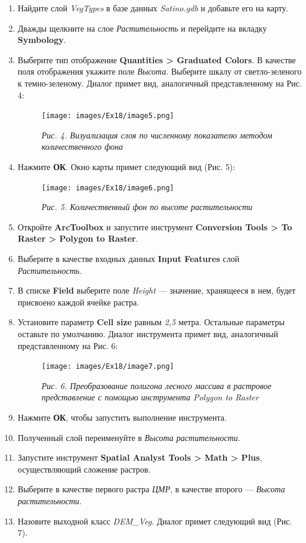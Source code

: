 \documentclass[12pt,]{book}
\begin{document}
\begin{enumerate}
\def\labelenumi{\arabic{enumi}.}
\item
  Найдите слой \emph{VegTypes} в базе данных \emph{Satino.gdb} и добавьте его на карту.
\item
  Дважды щелкните на слое \emph{Растительность} и перейдите на вкладку \textbf{Symbology}.
\item
  Выберите тип отображение \textbf{Quantities \textgreater{} Graduated Colors}. В качестве поля отображения укажите поле \emph{Высота}. Выберите шкалу от светло-зеленого к темно-зеленому. Диалог примет вид, аналогичный представленному на Рис. 4:

  \begin{figure}
  \centering
  \texttt{[image: images/Ex18/image5.png]}
  \caption{\emph{Рис. 4. Визуализация слоя по численному показателю методом количественного фона}}
  \end{figure}
\item
  Нажмите \textbf{ОК}. Окно карты примет следующий вид (Рис. 5):

  \begin{figure}
  \centering
  \texttt{[image: images/Ex18/image6.png]}
  \caption{\emph{Рис. 5. Количественный фон по высоте растительности}}
  \end{figure}
\item
  Откройте \textbf{ArcToolbox} и запустите инструмент \textbf{Conversion Tools \textgreater{} To Raster \textgreater{} Polygon to Raster}.
\item
  Выберите в качестве входных данных \textbf{Input Features} слой \emph{Растительность}.
\item
  В списке \textbf{Field} выберите поле \emph{Height} --- значение, хранящееся в нем, будет присвоено каждой ячейке растра.
\item
  Установите параметр \textbf{Cell size} равным \emph{2,5} метра. Остальные параметры оставьте по умолчанию. Диалог инструмента примет вид, аналогичный представленному на Рис. 6:

  \begin{figure}
  \centering
  \texttt{[image: images/Ex18/image7.png]}
  \caption{\emph{Рис. 6. Преобразование полигона лесного массива в растровое представление с помощью инструмента Polygon to Raster}}
  \end{figure}
\item
  Нажмите \textbf{ОК}, чтобы запустить выполнение инструмента.
\item
  Полученный слой переименуйте в \emph{Высота растительности}.
\item
  Запустите инструмент \textbf{Spatial Analyst Tools \textgreater{} Math \textgreater{} Plus}, осуществляющий сложение растров.
\item
  Выберите в качестве первого растра \emph{ЦМР}, в качестве второго --- \emph{Высота растительности}.
\item
  Назовите выходной класс \emph{DEM\_Veg}. Диалог примет следующий вид (Рис. 7).


\end{enumerate}
\end{document}
